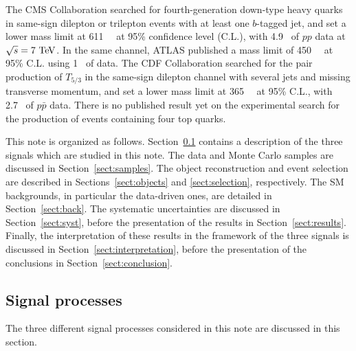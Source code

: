 The CMS Collaboration searched for fourth-generation down-type heavy quarks in same-sign dilepton
or trilepton events with at least one $b$-tagged jet, and set a lower mass limit at 
611~\GeV{}~\cite{Chatrchyan:2012yea} at 95\% confidence level (C.L.), 
with 4.9~\ifb{} of $pp$ data at $\sqrt{s}=7 \TeV$.
In the same channel, ATLAS published a mass limit of 450~\GeV{}~\cite{Aad:2012bb} at 95\% C.L.
using 1~\ifb{} of data.
The CDF Collaboration searched for the pair production of $T_{5/3}$ in the same-sign dilepton
channel with several jets and missing transverse momentum, and set a lower mass limit at
365~\GeV{}~\cite{Aaltonen:2009nr} at 95\% C.L., with 2.7~\ifb{} of $p\bar{p}$ data.
There is no published result yet on the experimental search for the production 
of events containing four top quarks.

This note is organized as follows. Section~\ref{sect:models} contains a description of the
three signals which are studied in this note. The data and Monte Carlo samples are discussed in
Section~\ref{sect:samples}. The object reconstruction and event selection are described in 
Sections~\ref{sect:objects} and \ref{sect:selection}, respectively. The SM backgrounds,
in particular the data-driven ones, are detailed in Section~\ref{sect:back}. The systematic
uncertainties are discussed in Section~\ref{sect:syst}, before the presentation of the results
in Section~\ref{sect:results}. Finally, the interpretation of these results in the framework of the
three signals is discussed in Section~\ref{sect:interpretation}, before the presentation of the
conclusions in Section~\ref{sect:conclusion}.

\subsection{Signal processes}\label{sect:models}
The three different signal processes considered in this note are discussed in this section.

